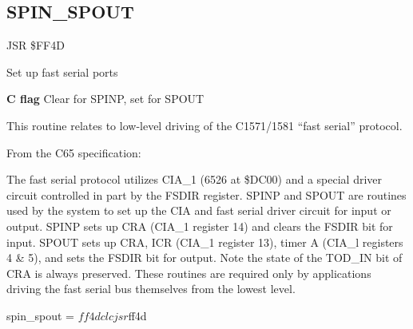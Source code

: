 \subsection{SPIN{\_}SPOUT}
\label{KERNAL Jump Table!SPIN_SPOUT}
\begin{description}[leftmargin=2cm,style=nextline]
    \item [Address:] JSR \$FF4D
    \item [Description:] Set up fast serial ports
    \item [Inputs:]
        \textbf{C flag} Clear for SPINP, set for SPOUT
    \item [Remarks:]
    This routine relates to low-level driving of the C1571/1581 ``fast serial'' protocol.

    From the C65 specification:

    The  fast serial protocol utilizes CIA\_1 (6526 at \$DC00) and a special
    driver  circuit  controlled  in  part by the FSDIR register. SPINP and
    SPOUT  are  routines  used  by  the  system to set up the CIA and fast
    serial  driver  circuit  for input or output. SPINP sets up CRA (CIA\_1
    register  14)  and  clears the FSDIR bit for input. SPOUT sets up CRA,
    ICR (CIA\_1 register 13), timer A (CIA\_l registers 4 \& 5), and sets the
    FSDIR  bit  for  output.  Note  the  state of the TOD\_IN bit of CRA is
    always  preserved.  These  routines  are required only by applications
    driving the fast serial bus themselves from the lowest level.
    \item [Example:]
        \begin{asmcode}
spin_spout = $ff4d

    clc
    jsr $ff4d
        \end{asmcode}
\end{description}



\newpage
